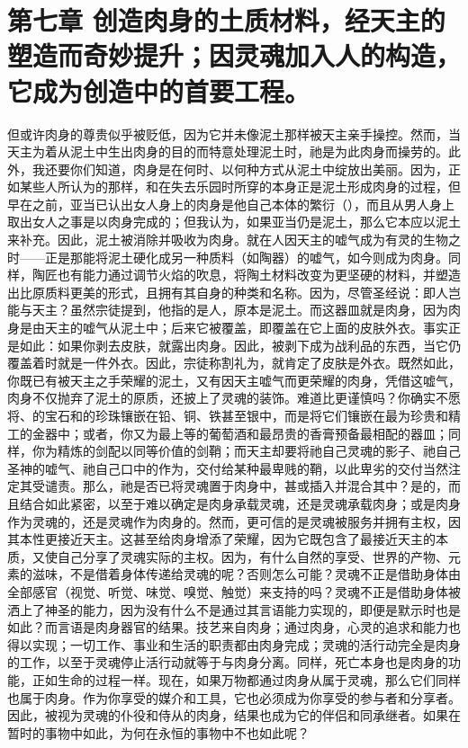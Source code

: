 \section{第七章 创造肉身的土质材料，经天主的塑造而奇妙提升；因灵魂加入人的构造，它成为创造中的首要工程。}

但或许肉身的尊贵似乎被贬低，因为它并未像泥土那样被天主亲手操控。然而，当天主为着从泥土中生出肉身的目的而特意处理泥土时，祂是为此肉身而操劳的。此外，我还要你们知道，肉身是在何时、以何种方式从泥土中绽放出美丽。因为，正如某些人所认为的那样，和在失去乐园时所穿的本身正是泥土形成肉身的过程，但早在之前，亚当已认出女人身上的肉身是他自己本体的繁衍（），而且从男人身上取出女人之事是以肉身完成的；但我认为，如果亚当仍是泥土，那么它本应以泥土来补充。因此，泥土被消除并吸收为肉身。就在人因天主的嘘气成为有灵的生物之时——正是那能将泥土硬化成另一种质料（如陶器）的嘘气，如今则成为肉身。同样，陶匠也有能力通过调节火焰的吹息，将陶土材料改变为更坚硬的材料，并塑造出比原质料更美的形式，且拥有其自身的种类和名称。因为，尽管圣经说：即人岂能与天主？虽然宗徒提到，他指的是人，原本是泥土。而这器皿就是肉身，因为肉身是由天主的嘘气从泥土中；后来它被覆盖，即覆盖在它上面的皮肤外衣。事实正是如此：如果你剥去皮肤，就露出肉身。因此，被剥下成为战利品的东西，当它仍覆盖着时就是一件外衣。因此，宗徒称割礼为，就肯定了皮肤是外衣。既然如此，你既已有被天主之手荣耀的泥土，又有因天主嘘气而更荣耀的肉身，凭借这嘘气，肉身不仅抛弃了泥土的原质，还披上了灵魂的装饰。难道比更谨慎吗？你确实不愿将、的宝石和的珍珠镶嵌在铅、铜、铁甚至银中，而是将它们镶嵌在最为珍贵和精工的金器中；或者，你又为最上等的葡萄酒和最昂贵的香膏预备最相配的器皿；同样，你为精炼的剑配以同等价值的剑鞘；而天主却要将祂自己灵魂的影子、祂自己圣神的嘘气、祂自己口中的作为，交付给某种最卑贱的鞘，以此卑劣的交付当然注定其受谴责。那么，祂是否已将灵魂置于肉身中，甚或插入并混合其中？是的，而且结合如此紧密，以至于难以确定是肉身承载灵魂，还是灵魂承载肉身；或是肉身作为灵魂的，还是灵魂作为肉身的。然而，更可信的是灵魂被服务并拥有主权，因其本性更接近天主。这甚至给肉身增添了荣耀，因为它既包含了最接近天主的本质，又使自己分享了灵魂实际的主权。因为，有什么自然的享受、世界的产物、元素的滋味，不是借着身体传递给灵魂的呢？否则怎么可能？灵魂不正是借助身体由全部感官（视觉、听觉、味觉、嗅觉、触觉）来支持的吗？灵魂不正是借助身体被洒上了神圣的能力，因为没有什么不是通过其言语能力实现的，即便是默示时也是如此？而言语是肉身器官的结果。技艺来自肉身；通过肉身，心灵的追求和能力也得以实现；一切工作、事业和生活的职责都由肉身完成；灵魂的活行动完全是肉身的工作，以至于灵魂停止活行动就等于与肉身分离。同样，死亡本身也是肉身的功能，正如生命的过程一样。现在，如果万物都通过肉身从属于灵魂，那么它们同样也属于肉身。作为你享受的媒介和工具，它也必须成为你享受的参与者和分享者。因此，被视为灵魂的仆役和侍从的肉身，结果也成为它的伴侣和同承继者。如果在暂时的事物中如此，为何在永恒的事物中不也如此呢？\par

